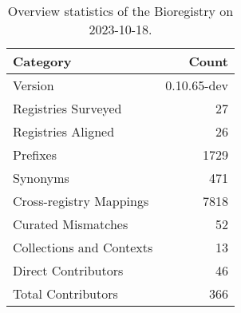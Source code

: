\begin{table}
\caption{Overview statistics of the Bioregistry on 2023-10-18.}
\label{tab:bioregistry-summary}
\begin{tabular}{lr}
\toprule
Category & Count \\
\midrule
Version & 0.10.65-dev \\
Registries Surveyed & 27 \\
Registries Aligned & 26 \\
Prefixes & 1729 \\
Synonyms & 471 \\
Cross-registry Mappings & 7818 \\
Curated Mismatches & 52 \\
Collections and Contexts & 13 \\
Direct Contributors & 46 \\
Total Contributors & 366 \\
\bottomrule
\end{tabular}
\end{table}
